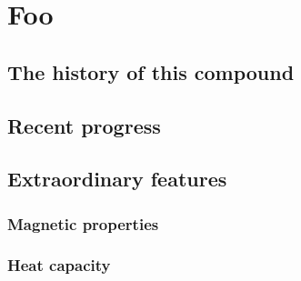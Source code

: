 
\chapter{Foo}\label{chap:foo}

\section{The history of this compound}
\lipsum[1-5]

\section{Recent progress}
\lipsum[6-8]

\section{Extraordinary features}
\lipsum[21-25]

\subsection*{Magnetic properties}
\lipsum[26-28]

\subsection*{Heat capacity}
\lipsum[29-32]
